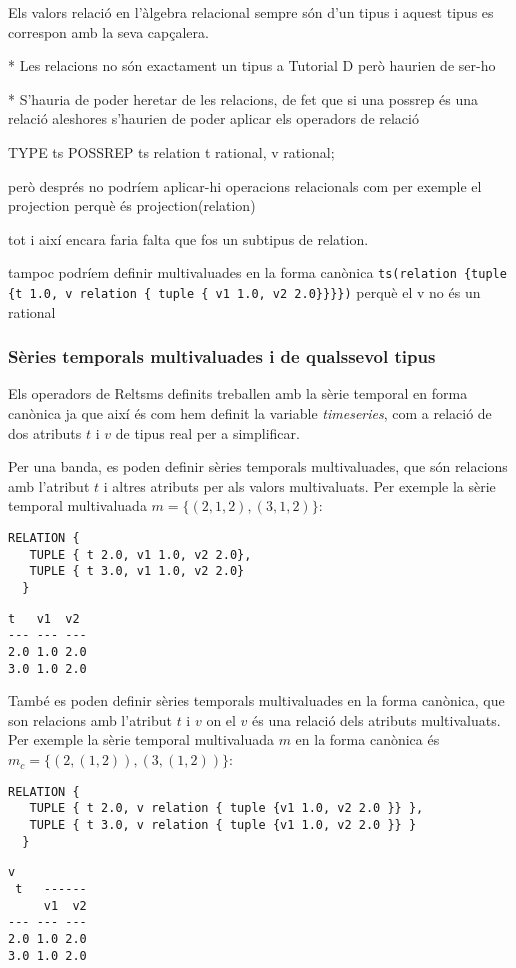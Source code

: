 Els valors relació en l'àlgebra relacional sempre són d'un tipus i
aquest tipus es correspon amb la seva capçalera. 

* Les relacions no són exactament un tipus a Tutorial D però haurien de ser-ho

* S'hauria de poder heretar de les relacions, de fet que si una possrep és una relació aleshores s'haurien de poder aplicar els operadors de relació


TYPE ts POSSREP {ts relation {t rational, v rational}};

però després no podríem aplicar-hi operacions relacionals com per exemple el projection perquè és projection(relation)

 tot i així encara faria falta que fos un subtipus de relation.




tampoc podríem definir multivaluades en la forma canònica \verb+ts(relation {tuple {t 1.0, v relation { tuple { v1 1.0, v2 2.0}}}})+ perquè el v no és un rational




\subsubsection{Sèries temporals multivaluades i de qualssevol tipus}

Els operadors de Reltsms definits treballen amb la sèrie temporal en
forma canònica ja que així és com hem definit la variable
\emph{timeseries}, com a relació de dos atributs $t$ i $v$ de tipus
real per a simplificar.

Per una banda, es poden definir sèries temporals multivaluades, que
són relacions amb l'atribut $t$ i altres atributs per als valors
multivaluats. Per exemple la sèrie temporal multivaluada $m = \{
(2,1,2),(3,1,2) \}$:
\begin{lstlisting}[style=tutorialD]
 RELATION {
   TUPLE { t 2.0, v1 1.0, v2 2.0},
   TUPLE { t 3.0, v1 1.0, v2 2.0}
  }
\end{lstlisting}
\begin{lstlisting}[style=stdout]
 t   v1  v2
--- --- ---
2.0 1.0 2.0
3.0 1.0 2.0
\end{lstlisting}

També es poden definir sèries temporals multivaluades en la forma
canònica, que son relacions amb l'atribut $t$ i $v$ on el $v$ és una
relació dels atributs multivaluats. Per exemple la sèrie temporal
multivaluada $m$ en la forma canònica és $m_c = \{ (2,(1,2)),(3,(1,2))
\}$:
\begin{lstlisting}[style=tutorialD]
 RELATION {
   TUPLE { t 2.0, v relation { tuple {v1 1.0, v2 2.0 }} },
   TUPLE { t 3.0, v relation { tuple {v1 1.0, v2 2.0 }} }
  }
\end{lstlisting}
\begin{lstlisting}[style=stdout]
        v
 t   ------
     v1  v2
--- --- ---
2.0 1.0 2.0
3.0 1.0 2.0
\end{lstlisting}


